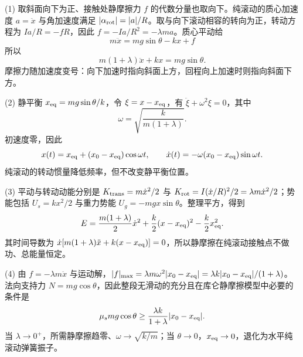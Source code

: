 (1) 取斜面向下为正、接触处静摩擦力 \(f\) 的代数分量也取向下。纯滚动的质心加速度 \(a=\ddot x\) 与角加速度满足 \(|\alpha_{\rm rot}|=|a|/R\)。取与向下滚动相容的转向为正，转动方程为 \(I a/R=-fR\)，因此 \(f=-I a/R^2=-\lambda ma\)。质心平动给
\[
m\ddot x=mg\sin\theta-kx+f
\]
所以
\[
m(1+\lambda)\ddot x+kx=mg\sin\theta .
\]
摩擦力随加速度变号：向下加速时指向斜面上方，回程向上加速时则指向斜面下方。

(2) 静平衡 \(x_{\rm eq}=mg\sin\theta/k\)，令 \(\xi=x-x_{\rm eq}\)，有 \(\ddot\xi+\omega^2\xi=0\)，其中
\[
\omega=\sqrt{\frac{k}{m(1+\lambda)}}.
\]
初速度零，因此
\[
x(t)=x_{\rm eq}+(x_0-x_{\rm eq})\cos\omega t,\qquad
\dot x(t)=-\omega(x_0-x_{\rm eq})\sin\omega t .
\]
纯滚动的转动惯量降低频率，但不改变静平衡位置。

(3) 平动与转动动能分别是 \(K_{\rm trans}=m\dot x^2/2\) 与 \(K_{\rm rot}=I(\dot x/R)^2/2=\lambda m\dot x^2/2\)；势能包括 \(U_s=kx^2/2\) 与重力势能 \(U_g=-mgx\sin\theta\)。整理平方，得到
\[
E=\frac{m(1+\lambda)}2\dot x^2
+\frac{k}{2}(x-x_{\rm eq})^2
-\frac k2x_{\rm eq}^2 .
\]
其时间导数为 \(\dot x[m(1+\lambda)\ddot x+k(x-x_{\rm eq})]=0\)，所以静摩擦在纯滚动接触点不做功、总能量恒定。

(4) 由 \(f=-\lambda m\ddot x\) 与运动解，\(|f|_{\max}=\lambda m\omega^2|x_0-x_{\rm eq}|=\lambda k|x_0-x_{\rm eq}|/(1+\lambda)\)。法向支持力 \(N=mg\cos\theta\)，因此整段无滑动的充分且在库仑静摩擦模型中必要的条件是
\[
\mu_s mg\cos\theta\ge\frac{\lambda k}{1+\lambda}|x_0-x_{\rm eq}|.
\]
当 \(\lambda\to0^+\)，所需静摩擦趋零、\(\omega\to\sqrt{k/m}\)；当 \(\theta\to0\)，\(x_{\rm eq}\to0\)，退化为水平纯滚动弹簧振子。
